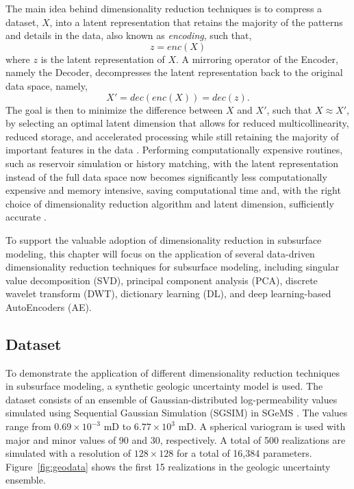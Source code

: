 \documentclass[a4paper,fleqn,12pt]{article}
\begin{document}
The main idea behind dimensionality reduction techniques is to compress a dataset, $X$, into a latent representation that retains the majority of the patterns and details in the data, also known as \emph{encoding}, such that,
\begin{equation}
    z=enc(X)
\end{equation}
where $z$ is the latent representation of $X$. A mirroring operator of the Encoder, namely the Decoder, decompresses the latent representation back to the original data space, namely,
\begin{equation}
    X'=dec(enc(X))=dec(z).
\end{equation}
The goal is then to minimize the difference between $X$ and $X'$, such that $X\approx X'$, by selecting an optimal latent dimension that allows for reduced multicollinearity, reduced storage, and accelerated processing while still retaining the majority of important features in the data \cite{mabadeje2024evaluating, mabadeje2024rigid}. Performing computationally expensive routines, such as reservoir simulation or history matching, with the latent representation instead of the full data space now becomes significantly less computationally expensive and memory intensive, saving computational time and, with the right choice of dimensionality reduction algorithm and latent dimension, sufficiently accurate \cite{morales2025optimal, chen2024assimilation}.

To support the valuable adoption of dimensionality reduction in subsurface modeling, this chapter will focus on the application of several data-driven dimensionality reduction techniques for subsurface modeling, including singular value decomposition (SVD), principal component analysis (PCA), discrete wavelet transform (DWT), dictionary learning (DL), and deep learning-based AutoEncoders (AE). 

\subsection*{Dataset}
To demonstrate the application of different dimensionality reduction techniques in subsurface modeling, a synthetic geologic uncertainty model is used. The dataset consists of an ensemble of Gaussian-distributed log-permeability values simulated using Sequential Gaussian Simulation (SGSIM) in SGeMS \cite{pyrcz2014geostatistical, pyrcz2024appliedgeostats, remy2009applied}. The values range from $0.69\times10^{-3}$ mD to $6.77\times10^3$ mD. A spherical variogram is used with major and minor values of 90 and 30, respectively. A total of 500 realizations are simulated with a resolution of $128\times128$ for a total of 16,384 parameters. Figure~\ref{fig:geodata} shows the first 15 realizations in the geologic uncertainty ensemble.
\end{document}
